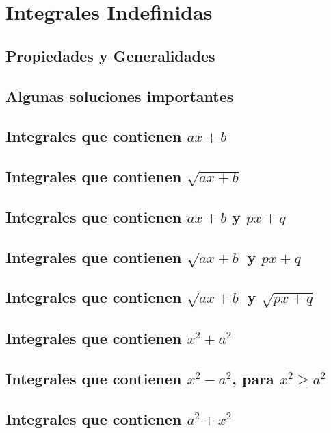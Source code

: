 \chapter{Integrales Indefinidas}

\section{Propiedades y Generalidades}

\section{Algunas soluciones importantes}

\section{Integrales que contienen $ax + b$}

\section{Integrales que contienen $\sqrt{ax + b}$}

\section{Integrales que contienen $ax + b$ y $px + q$}

\section{Integrales que contienen $\sqrt{ax + b}$ y $px + q$}

\section{Integrales que contienen $\sqrt{ax + b}$ y $\sqrt{px + q}$}

\section{Integrales que contienen $x^2 + a^2$}

\section{Integrales que contienen $x^2 - a^2$, para $x^2 \ge a^2$}

\section{Integrales que contienen $a^2 + x^2$}

